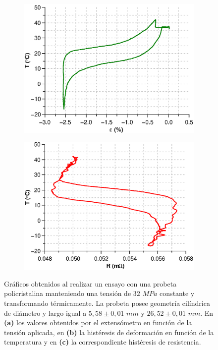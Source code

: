 \documentclass[a4paper,12pt,fleqn,twoside,openany]{book}
\begin{document}
\begin{figure}
\begin{subfigure}{0.4\textwidth}
        \includegraphics[width=\textwidth]{Img/Resultados/Resistencia/EjTempDef.eps}
        \caption{}%
        \label{fig:EjTempDef}
    \end{subfigure}
        \begin{subfigure}{0.4\textwidth}
        \includegraphics[width=\textwidth]{Img/Resultados/Resistencia/EjTempRes.eps}
        \caption{}%
        \label{fig:EjTempRes}
    \end{subfigure}    
    \caption{Gráficos obtenidos al realizar un ensayo con una probeta policristalina manteniendo una tensión de $32$ $MPa$ constante y transformando térmicamente. La probeta posee geometría cilíndrica de diámetro y largo igual a $5,58\pm 0,01$ $mm$ y $26,52\pm0,01$ $mm$. En \textbf{(a)} los valores obtenidos por el extensómetro en función de la tensión aplicada, en \textbf{(b)} la histéresis de deformación en función de la temperatura y en \textbf{(c)} la correspondiente histéresis de resistencia.}
    \label{fig: Ejemplos6b}
    \end{figure}
\end{document}
